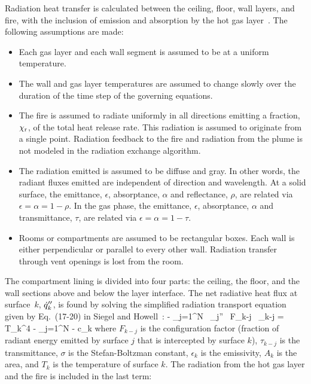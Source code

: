 Radiation heat transfer is calculated between the ceiling, floor, wall layers, and fire, with the inclusion of emission and absorption by the hot gas layer~\cite{Forney_radiation}. The following assumptions are made:
\begin{itemize}
\item Each gas layer and each wall segment is assumed to be at a uniform temperature.
\item The wall and gas layer temperatures are assumed to change slowly over the duration of the time step of the governing equations.
\item The fire is assumed to radiate uniformly in all directions emitting a fraction, $\chi_{\rm r}$, of the total heat release rate.  This radiation is assumed to originate from a single point.  Radiation feedback to the fire and radiation from the plume is not modeled in the radiation exchange algorithm.
\item The radiation emitted is assumed to be diffuse and gray.  In other words, the radiant fluxes emitted are independent of direction and wavelength. At a solid surface, the emittance, $\epsilon$, absorptance, $\alpha$ and reflectance, $\rho$, are related via $\epsilon = \alpha = 1 - \rho$. In the gas phase, the emittance, $\epsilon$, absorptance, $\alpha$ and transmittance, $\tau$, are related via $\epsilon = \alpha = 1 - \tau$.
\item Rooms or compartments are assumed to be rectangular boxes.  Each wall is either perpendicular or parallel to every other wall.  Radiation transfer through vent openings is lost from the room.
\end{itemize}
The compartment lining is divided into four parts: the ceiling, the floor, and the wall sections above and below the layer interface. The net radiative heat flux at surface~$k$, $\dot{q}_k''$, is found by solving the simplified radiation transport equation given by Eq.~(17-20) in Siegel and Howell~\cite{SiegelandHowell:1981}:
\be
    - \displaystyle\sum_{j=1}^N  \, \dq_j'' \, F_{k-j} \, \tau_{k-j} = \sigma T_k^4 - \displaystyle\sum_{j=1}^N  - c_k \label{RTE}
\ee
where $F_{k-j}$ is the configuration factor (fraction of radiant energy emitted by surface $j$ that is intercepted by surface $k$), $\tau_{k-j}$ is the transmittance, $\sigma$ is the Stefan-Boltzman constant, $\epsilon_k$ is the emissivity, $A_k$ is the area, and $T_k$ is the temperature of surface $k$. The radiation from the hot gas layer and the fire is included in the last term:
